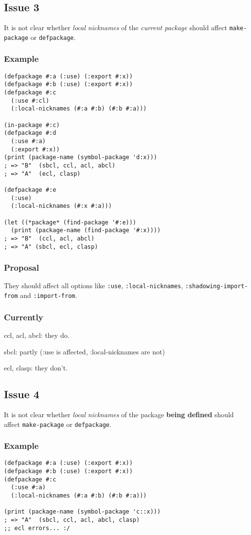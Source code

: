 \documentclass[11pt]{article}
\begin{document}
\subsection{Issue 3}
\label{sec:org899499b}
It is not clear whether \emph{local nicknames} of the \emph{current package} should
affect \texttt{make-package} or \texttt{defpackage}.
\subsubsection{Example}
\label{sec:org860871b}
\begin{verbatim}
(defpackage #:a (:use) (:export #:x))
(defpackage #:b (:use) (:export #:x))
(defpackage #:c
  (:use #:cl)
  (:local-nicknames (#:a #:b) (#:b #:a)))

(in-package #:c)
(defpackage #:d
  (:use #:a)
  (:export #:x))
(print (package-name (symbol-package 'd:x)))
; => "B"  (sbcl, ccl, acl, abcl)
; => "A"  (ecl, clasp)

(defpackage #:e
  (:use)
  (:local-nicknames (#:x #:a)))

(let ((*package* (find-package '#:e)))
  (print (package-name (find-package '#:x))))
; => "B"  (ccl, acl, abcl)
; => "A" (sbcl, ecl, clasp)
\end{verbatim}
\subsubsection{Proposal}
\label{sec:orgcf7e4a2}
They should affect all options like \texttt{:use}, \texttt{:local-nicknames},
\texttt{:shadowing-import-from} and \texttt{:import-from}.
\subsubsection{Currently}
\label{sec:org489a733}
ccl, acl, abcl: they do.

sbcl: partly (:use is affected, :local-nicknames are not)

ecl, clasp: they don't.
\subsection{Issue 4}
\label{sec:orgdc86dd9}
It is not clear whether \emph{local nicknames} of the package \textbf{being defined}
should affect \texttt{make-package} or \texttt{defpackage}.
\subsubsection{Example}
\label{sec:orgb30b0f7}
\begin{verbatim}
(defpackage #:a (:use) (:export #:x))
(defpackage #:b (:use) (:export #:x))
(defpackage #:c
  (:use #:a)
  (:local-nicknames (#:a #:b) (#:b #:a)))

(print (package-name (symbol-package 'c::x)))
; => "A"  (sbcl, ccl, acl, abcl, clasp)
;; ecl errors... :/
\end{verbatim}
\end{document}
